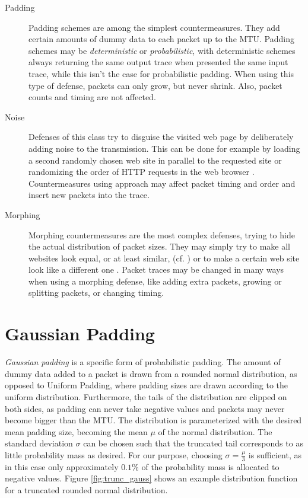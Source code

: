 \documentclass[
	ruledheaders=chapter,
	class=report,
	thesis={type=master, department=inf},
	accentcolor=1c,
	custommargins=true,
	marginpar=false,
	parskip=half-,
	fontsize=11pt,
]{tudapub}
\begin{document}
	\begin{description}
		\item[Padding] Padding schemes are among the simplest countermeasures. They add certain amounts of dummy data to each packet up to the MTU. Padding schemes may be \textit{deterministic} or \textit{probabilistic}, with deterministic schemes always returning the same output trace when presented the same input trace, while this isn't the case for probabilistic padding. When using this type of defense, packets can only grow, but never shrink. Also, packet counts and timing are not affected.
		\item[Noise] Defenses of this class try to disguise the visited web page by deliberately adding noise to the transmission. This can be done for example by loading a second randomly chosen web site in parallel to the requested site \cite{Panchenko2011} or randomizing the order of HTTP requests in the web browser \cite{Perry2011}. Countermeasures using approach may affect packet timing and order and insert new packets into the trace.
		\item[Morphing] Morphing countermeasures are the most complex defenses, trying to hide the actual distribution of packet sizes. They may simply try to make all websites look equal, or at least similar, (cf. \cite{Dyer2012,Cai2014,Cai2014a}) or to make a certain web site look like a different one \cite{Wright2009}. Packet traces may be changed in many ways when using a morphing defense, like adding extra packets, growing or splitting packets, or changing timing.
	\end{description}
	
	\section{Gaussian Padding}
	\label{gaussian_padding}
	
	\textit{Gaussian padding} is a specific form of probabilistic padding. The amount of dummy data added to a packet is drawn from a rounded normal distribution, as opposed to Uniform Padding, where padding sizes are drawn according to the uniform distribution. Furthermore, the tails of the distribution are clipped on both sides, as padding can never take negative values and packets may never become bigger than the MTU. The distribution is parameterized with the desired mean padding size, becoming the mean $\mu$ of the normal distribution. The standard deviation $\sigma$ can be chosen such that the truncated tail corresponds to as little probability mass as desired. For our purpose, choosing $\sigma = \frac{\mu}{3}$ is sufficient, as in this case only approximately $0.1\%$ of the probability mass is allocated to negative values. Figure \ref{fig:trunc_gauss} shows an example distribution function for a truncated rounded normal distribution.
	
\end{document}
